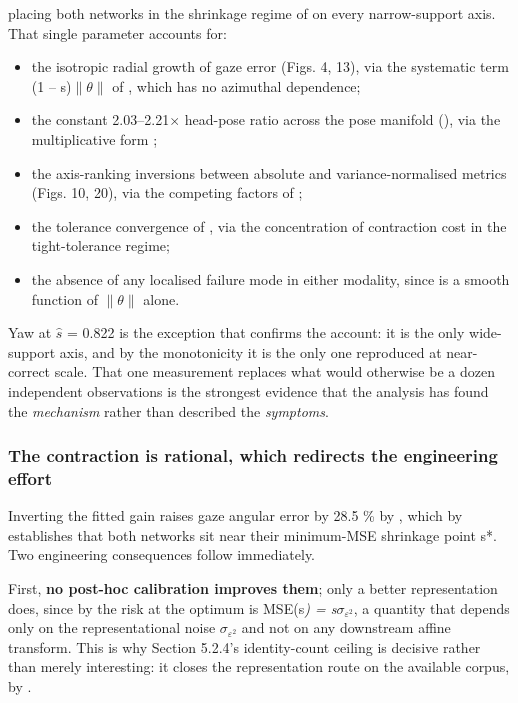 placing both networks in the shrinkage regime of  on every narrow-support axis. That single parameter accounts for:

\begin{itemize}
\item the isotropic radial growth of gaze error (Figs. 4, 13), via the systematic term (1 -- s)$\|\theta\|$ of , which has no azimuthal dependence;
\item the constant 2.03--2.21$\times$ head-pose ratio across the pose manifold (), via the multiplicative form ;
\item the axis-ranking inversions between absolute and variance-normalised metrics (Figs. 10, 20), via the competing factors of ;
\item the tolerance convergence of , via the concentration of contraction cost in the tight-tolerance regime;
\item the absence of any localised failure mode in either modality, since  is a smooth function of $\|\theta\|$ alone.
\end{itemize}

Yaw at $\hat{s}$ = 0.822 is the exception that confirms the account: it is the only wide-support axis, and by the monotonicity  it is the only one reproduced at near-correct scale. That one measurement replaces what would otherwise be a dozen independent observations is the strongest evidence that the analysis has found the \emph{mechanism} rather than described the \emph{symptoms}.

\subsubsection{The contraction is rational, which redirects the engineering effort}

Inverting the fitted gain raises gaze angular error by 28.5 \% by , which by  establishes that both networks sit near their minimum-MSE shrinkage point s*. Two engineering consequences follow immediately.

First, \textbf{no post-hoc calibration improves them}; only a better representation does, since by  the risk at the optimum is MSE(s\emph{) = s}$\sigma_{\varepsilon^{2}}$, a quantity that depends only on the representational noise $\sigma_{\varepsilon^{2}}$ and not on any downstream affine transform. This is why Section 5.2.4's identity-count ceiling is decisive rather than merely interesting: it closes the representation route on the available corpus, by .


